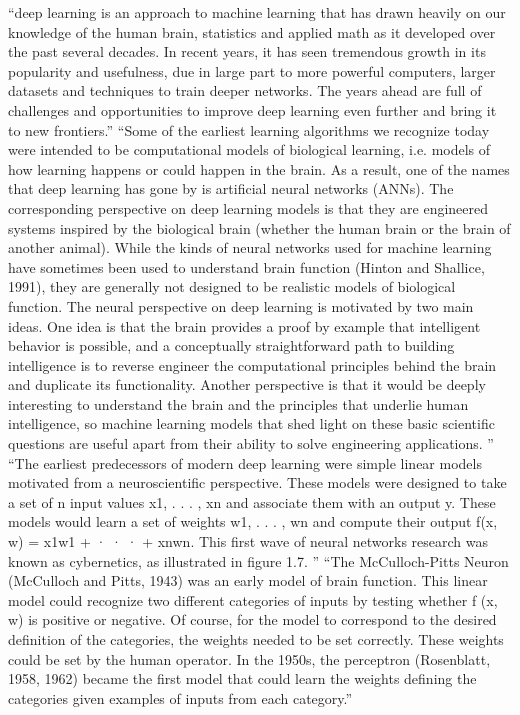 \documentclass{automatextcc}
\begin{document}
``deep learning is an approach to machine learning that has drawn heavily on our knowledge of the human brain, statistics and applied math as it developed over the past several decades. In recent years, it has seen tremendous growth in its popularity and usefulness, due in large part to more powerful computers, larger datasets and techniques to train deeper networks. The years ahead are full of challenges and opportunities to improve deep learning even further and bring it to new frontiers.''
``Some of the earliest learning algorithms we recognize today were intended
to be computational models of biological learning, i.e. models of how learning happens or could happen in the brain. As a result, one of the names that deep learning has gone by is artificial neural networks (ANNs). The corresponding perspective on deep learning models is that they are engineered systems inspired by the biological brain (whether the human brain or the brain of another animal). While the kinds of neural networks used for machine learning have sometimes been used to understand brain function (Hinton and Shallice, 1991), they are generally not designed to be realistic models of biological function. The neural perspective on deep learning is motivated by two main ideas. One idea is that the brain provides a proof by example that intelligent behavior is possible, and a conceptually straightforward path to building intelligence is to reverse engineer the computational principles behind the brain and duplicate its functionality. Another perspective is that it would be deeply interesting to understand the brain and the principles that underlie human intelligence, so machine learning models that shed light on these basic scientific questions are useful apart from their ability to solve engineering applications. ''
``The earliest predecessors of modern deep learning were simple linear models motivated from a neuroscientific perspective. These models were designed to take a set of n input values x1, . . . , xn and associate them with an output y. These models would learn a set of weights w1, . . . , wn and compute their output f(x, w) = x1w1 + · · · + xnwn. This first wave of neural networks research was known as cybernetics, as illustrated in figure 1.7. ''
``The McCulloch-Pitts Neuron (McCulloch and Pitts, 1943) was an early model of brain function. This linear model could recognize two different categories of inputs by testing whether f (x, w) is positive or negative. Of course, for the model to correspond to the desired definition of the categories, the weights needed to be set correctly. These weights could be set by the human operator. In the 1950s, the perceptron (Rosenblatt, 1958, 1962) became the first model that could learn the weights defining the categories given examples of inputs from each category.''
\end{document}
